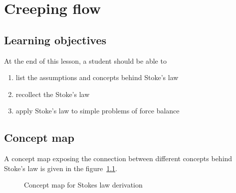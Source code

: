 \chapter{Creeping flow}
\label{ch:creepflow}

\section{Learning objectives}

At the end of this lesson, a student should be able to

\begin{enumerate}
\item list the assumptions and concepts behind Stoke's law
\item recollect the Stoke's law
\item apply Stoke's law to simple problems of force balance
\end{enumerate}


\section{Concept map}

A concept map exposing the connection between different concepts behind Stoke's law is given in the figure~\ref{StokesConceptMap}.

\begin{figure}[h]
\begin{center}
\end{center}
\caption{Concept map for Stokes law derivation}
\label{StokesConceptMap}
\end{figure}

